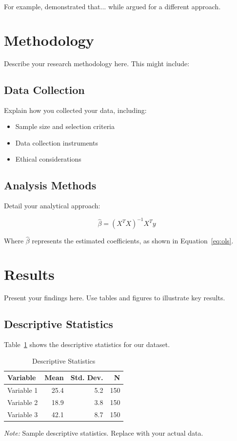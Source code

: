 \documentclass[a4paper, 12pt, oneside]{article}
\theoremstyle{definition}
\theoremstyle{remark}
\begin{document}
For example, \textcite{important2021} demonstrated that... while \textcite{another2020} argued for a different approach.

\section{Methodology}
\label{sec:methodology}

Describe your research methodology here. This might include:

\subsection{Data Collection}
Explain how you collected your data, including:
\begin{itemize}
    \item Sample size and selection criteria
    \item Data collection instruments
    \item Ethical considerations
\end{itemize}

\subsection{Analysis Methods}
Detail your analytical approach:

\begin{equation}
    \hat{\beta} = (X^T X)^{-1} X^T y
    \label{eq:ols}
\end{equation}

Where $\hat{\beta}$ represents the estimated coefficients, as shown in Equation~\ref{eq:ols}.

\section{Results}
\label{sec:results}

Present your findings here. Use tables and figures to illustrate key results.

\subsection{Descriptive Statistics}

Table~\ref{tab:descriptive} shows the descriptive statistics for our dataset.

\begin{table}[htbp]
    \centering
    \caption{Descriptive Statistics}
    \label{tab:descriptive}
    \begin{tabular}{lrrr}
        \toprule
        Variable & Mean & Std. Dev. & N \\
        \midrule
        Variable 1 & 25.4 & 5.2 & 150 \\
        Variable 2 & 18.9 & 3.8 & 150 \\
        Variable 3 & 42.1 & 8.7 & 150 \\
        \bottomrule
    \end{tabular}
    \footnotesize
    \textit{Note:} Sample descriptive statistics. Replace with your actual data.
\end{table}
\end{document}

